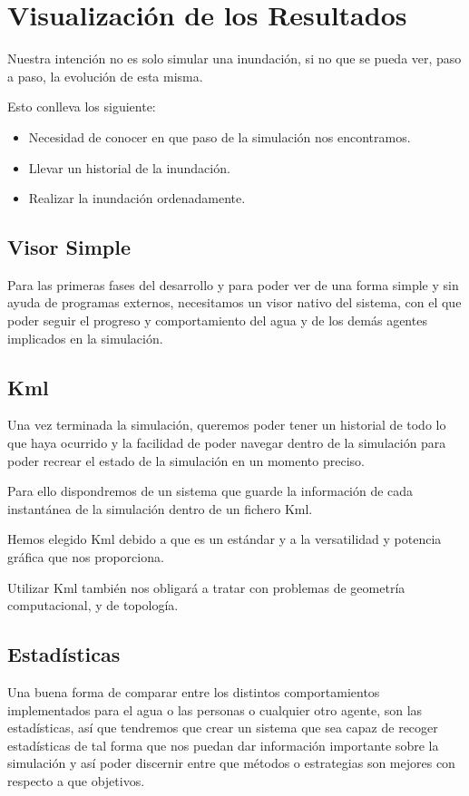 \section*{Visualización de los Resultados}

Nuestra intención no es solo simular una inundación, si no que se pueda ver,
paso a paso, la evolución de esta misma. 

Esto conlleva los siguiente:
\begin {itemize}
\item Necesidad de conocer en que paso de la simulación nos encontramos.
\item Llevar un historial de la inundación.
\item Realizar la inundación ordenadamente.
\end {itemize}

\subsection*{Visor Simple}
Para las primeras fases del desarrollo y para poder ver de una forma simple y
sin ayuda de programas externos, necesitamos un visor nativo del sistema, con
el que poder seguir el progreso y comportamiento del agua y de los demás
agentes implicados en la simulación.
\subsection*{Kml}

Una vez terminada la simulación, queremos poder tener un historial de todo lo
que haya ocurrido y la facilidad de poder navegar dentro de la simulación para
poder recrear el estado de la simulación en un momento preciso.

Para ello dispondremos de un sistema que guarde la información de cada
instantánea de la simulación dentro de un fichero Kml.

Hemos elegido Kml debido a que es un estándar y a la versatilidad y potencia
gráfica que nos proporciona.

Utilizar Kml también nos obligará a tratar con problemas de geometría
computacional, y de topología. 

\subsection*{Estadísticas}
Una buena forma de comparar entre los distintos comportamientos implementados
para el agua o las personas o cualquier otro agente, son las estadísticas, así
que tendremos que crear un sistema que sea capaz de recoger estadísticas de tal
forma que nos puedan dar información importante sobre la simulación y así poder
discernir entre que métodos o estrategias son mejores con respecto a que
objetivos.

